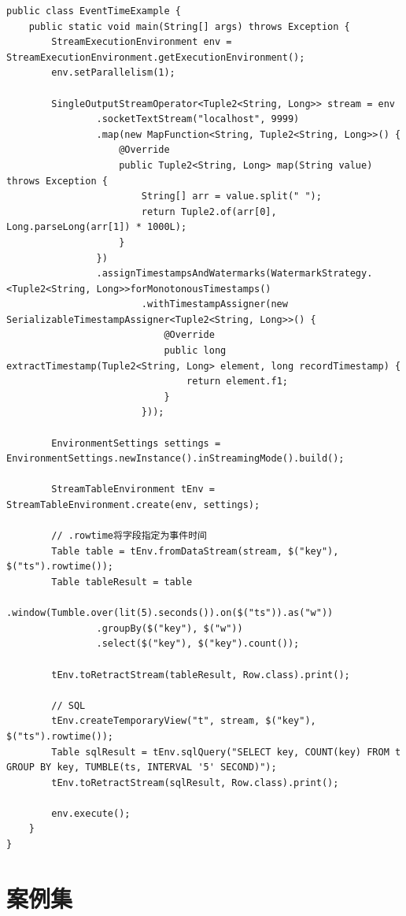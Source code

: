 \documentclass[cn,11pt,chinese]{elegantbook}
\begin{document}
\begin{verbatim}
public class EventTimeExample {
    public static void main(String[] args) throws Exception {
        StreamExecutionEnvironment env = StreamExecutionEnvironment.getExecutionEnvironment();
        env.setParallelism(1);

        SingleOutputStreamOperator<Tuple2<String, Long>> stream = env
                .socketTextStream("localhost", 9999)
                .map(new MapFunction<String, Tuple2<String, Long>>() {
                    @Override
                    public Tuple2<String, Long> map(String value) throws Exception {
                        String[] arr = value.split(" ");
                        return Tuple2.of(arr[0], Long.parseLong(arr[1]) * 1000L);
                    }
                })
                .assignTimestampsAndWatermarks(WatermarkStrategy.<Tuple2<String, Long>>forMonotonousTimestamps()
                        .withTimestampAssigner(new SerializableTimestampAssigner<Tuple2<String, Long>>() {
                            @Override
                            public long extractTimestamp(Tuple2<String, Long> element, long recordTimestamp) {
                                return element.f1;
                            }
                        }));

        EnvironmentSettings settings = EnvironmentSettings.newInstance().inStreamingMode().build();

        StreamTableEnvironment tEnv = StreamTableEnvironment.create(env, settings);

        // .rowtime将字段指定为事件时间
        Table table = tEnv.fromDataStream(stream, $("key"), $("ts").rowtime());
        Table tableResult = table
                .window(Tumble.over(lit(5).seconds()).on($("ts")).as("w"))
                .groupBy($("key"), $("w"))
                .select($("key"), $("key").count());

        tEnv.toRetractStream(tableResult, Row.class).print();

        // SQL
        tEnv.createTemporaryView("t", stream, $("key"), $("ts").rowtime());
        Table sqlResult = tEnv.sqlQuery("SELECT key, COUNT(key) FROM t GROUP BY key, TUMBLE(ts, INTERVAL '5' SECOND)");
        tEnv.toRetractStream(sqlResult, Row.class).print();

        env.execute();
    }
}
\end{verbatim}

\chapter{案例集}
\end{document}
